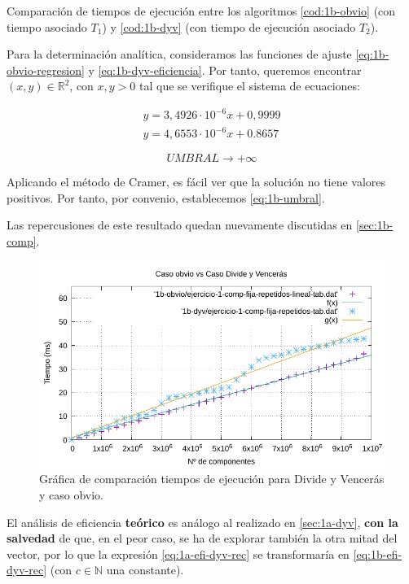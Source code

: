 \begin{table}
    \caption{Comparación de tiempos de ejecución entre los algoritmos \ref{cod:1b-obvio} 
    (con tiempo asociado $T_1$) y \ref{cod:1b-dyv} (con tiempo de
    ejecución asociado $T_2$).}
    \label{tab:1b-comp}
\end{table}

Para la determinación analítica, consideramos las funciones de ajuste \ref{eq:1b-obvio-regresion} y \ref{eq:1b-dyv-eficiencia}. Por tanto,
queremos encontrar $(x,y) \in \mathbb R ^2$, con $x,y>0$ tal que se 
verifique el sistema de ecuaciones:

\begin{eqnarray}
	 y = 3,4926 \cdot 10 ^{-6} x + 0,9999 \\
	 y = 4,6553 \cdot 10^{-6} x + 0.8657
\end{eqnarray} 

\begin{equation}
    \boxed{UMBRAL \rightarrow +\infty}
    \label{eq:1b-umbral}
\end{equation}

Aplicando el método de Cramer, es fácil ver que la solución no tiene valores
positivos. Por tanto, por convenio, establecemos \ref{eq:1b-umbral}.

Las repercusiones de este resultado quedan nuevamente discutidas en \ref{sec:1b-comp}.

\begin{figure}
    \centering
    \includegraphics[scale=0.76]{img/e1b-comp.pdf}
    \caption{Gráfica de comparación tiempos de ejecución para Divide y Vencerás y caso obvio.}
    \label{fig:1b-comp}
\end{figure}


El análisis de eficiencia \textbf{teórico} es análogo al realizado en \ref{sec:1a-dyv}, \textbf{con la salvedad} de que, en el
peor caso, se ha de explorar también la otra mitad del vector, por lo que la expresión \ref{eq:1a-efi-dyv-rec}
se transformaría en \ref{eq:1b-efi-dyv-rec} (con $c \in \mathbb N$ una constante). 


